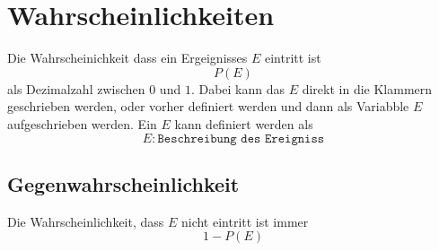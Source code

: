 \documentclass{article}
\begin{document}
 
\section{Wahrscheinlichkeiten} 
Die Wahrscheinichkeit dass ein Ergeignisses $E$ eintritt ist
\[
 P(E) 
\]
als Dezimalzahl zwischen $0$ und $1$. Dabei kann das $E$ direkt in die Klammern geschrieben werden, oder vorher definiert werden und dann als Variabble $E$ aufgeschrieben werden. Ein $E$ kann definiert werden als
\[
 E : \texttt{Beschreibung des Ereigniss} 
\] 
 
\subsection{Gegenwahrscheinlichkeit}
Die Wahrscheinlichkeit, dass $E$ nicht eintritt ist immer
\[
 1 - P(E) 
\] 
 
\end{document}
